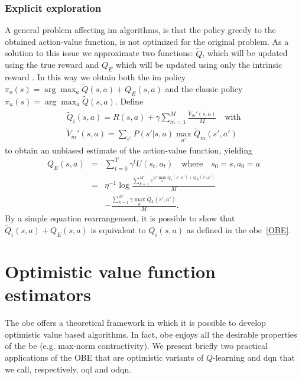 \subsubsection{Explicit exploration} A general problem affecting \gls{im} algorithms, is that the policy greedy to the obtained action-value function, is not optimized for the original problem. As a solution to this issue we approximate two functions: $\tilde{Q}$, which will be updated using the true reward and $Q_E$ which will be updated using only the intrinsic reward \cite{szita2008many}. In this way we obtain both the \gls{im} policy $\pi_o(s) = \arg \max_{a} \tilde{Q}(s,a) + Q_E(s,a)$ and the classic policy  $\pi_u(s) = \arg \max_{a} \tilde{Q}(s,a)$.
Define 
\begin{eqnarray}
	\tilde{Q}_i(s,a) = R(s,a) + \gamma \sum_{m=1}^M\frac{\tilde{V}_m'(s,a)}{M} \quad \text{with} \\
	\tilde{V}_m'(s,a) =  \sum_{s'} P(s'|s,a)\max_{a'}\tilde{Q}_m(s',a')
\end{eqnarray}
to obtain an unbiased estimate of the action-value function, yielding
\begin{eqnarray}
Q_E(s,a) & = & \sum_{t=0}^T \gamma^t U(s_t,a_t) \quad \text{where} \quad s_0 = s, a_0 = a \nonumber \\
& = & \eta^{-1}\log \frac{\sum_{k=1}^M e^{\eta\gamma\max_{a'}\tilde{Q}_k(s',a') + Q_E(s',a')}}{M}\nonumber \\
& &  -  \frac{\sum_{k=1}^M \gamma\max_{a'}\tilde{Q}_k(s',a')}{M}.
\end{eqnarray}
By a simple equation rearrangement, it is possible to show that $\tilde{Q}_i(s,a) + Q_E(s,a)$ is equivalent to $Q_i(s,a)$ as defined in the \gls{obe}~\ref{OBE}.
 
\section{Optimistic value function estimators}
The \gls{obe} offers a theoretical framework in which it is possible to develop optimistic value based algorithms. In fact, \gls{obe} enjoys all the desirable properties of the \gls{be} (e.g. max-norm contractivity). We present briefly two practical applications of the OBE that are optimistic variants of $Q$-learning and \gls{dqn} that we call, respectively, \gls{oql} and \gls{odqn}.
